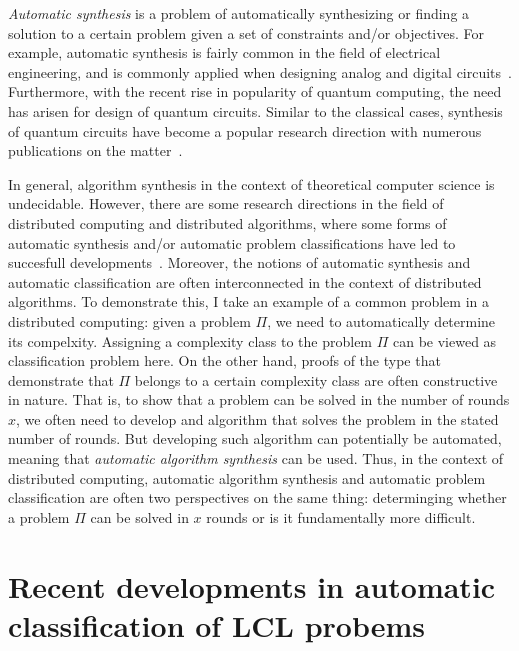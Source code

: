 \emph{Automatic synthesis} is a problem of automatically
synthesizing or finding
a solution to a certain problem given a set of constraints and/or
objectives. For example, automatic synthesis is fairly common
in the field of electrical engineering, and is commonly
applied when designing analog and digital circuits~\cite{synthesis_,
synthesis_autoAx}. Furthermore, with the recent rise in popularity
of quantum computing, the need has arisen for design of quantum
circuits. Similar to the classical cases, synthesis of
quantum circuits have become a popular research direction
with numerous publications on the matter~\cite{synthesis_Khan2017,
synthesis_Meuli2018, synthesis_Miller2003}.

In general, algorithm synthesis in the context of theoretical
computer science is undecidable. However, there are some
research directions in the field of distributed computing and
distributed algorithms, where some forms of automatic synthesis and/or
automatic problem classifications have led to succesfull
developments~\cite{Balliu2018, da-synthesis_Rybicki2015,
da-synthesis_Klinkhamer2016,
da-synthesis_Hirvonen2017, da-synthesis_Fathiyeh2015, da-synthesis_Dolev2016,
Chang2017, Brandt2017, da-synthesis_Bloem2016}. Moreover,
the notions of automatic synthesis and automatic classification are
often interconnected in the context of distributed algorithms.
To demonstrate this, I take an example of a common problem in
a distributed computing: given a problem $\Pi$, we need to
automatically determine its compelxity. Assigning a complexity
class to the problem $\Pi$ can be viewed as classification
problem here. On the other hand, proofs of the type that
demonstrate that $\Pi$ belongs to a certain complexity class
are often constructive in nature. That is, to show that a
problem can be solved in the number of rounds $x$, we
often need to develop and algorithm that solves the problem
in the stated number of rounds. But developing such algorithm
can potentially be automated, meaning that \emph{automatic
algorithm synthesis} can be used. Thus, in the context of
distributed computing, automatic algorithm
synthesis and automatic problem classification are often two perspectives
on the same thing: determinging whether a problem $\Pi$ can be solved
in $x$ rounds or is it fundamentally more difficult.

\section{Recent developments in automatic classification of LCL probems}


